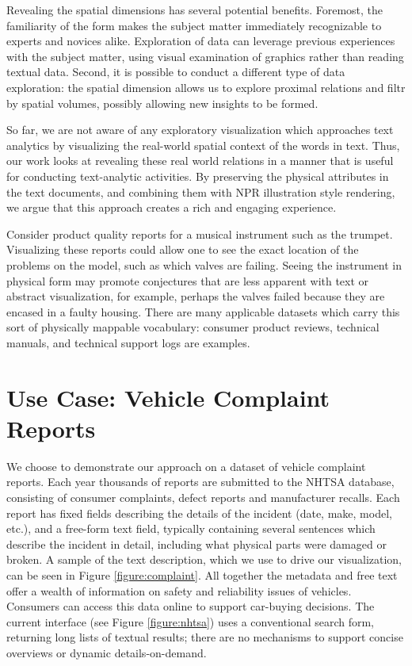 Revealing the spatial dimensions has several potential benefits. Foremost, the
familiarity of the form makes the subject matter immediately recognizable
to experts and novices alike. Exploration of data can leverage previous 
experiences with the subject matter, using visual examination of graphics 
rather than reading textual data. Second, it is possible to conduct a different
type of data exploration: the spatial dimension allows us to explore
proximal relations and filtr by spatial volumes, possibly allowing
new insights to be formed.

So far, we are not aware of any exploratory visualization which approaches text
analytics by visualizing the real-world spatial context of the words in
text. Thus, our work looks at revealing these real world relations in a manner
that is useful for conducting text-analytic activities. By preserving the physical
attributes in the text documents, and combining them with NPR illustration style 
rendering, we argue that this approach creates a rich and engaging experience.

Consider product quality reports for a musical instrument such as the trumpet.
Visualizing these reports could allow one to see the exact location of the problems on the
\threed model, such as which valves are failing. Seeing the instrument
in physical form may promote conjectures that are less apparent
with text or abstract visualization, for example, perhaps the valves
failed because they are encased in a faulty housing. There are many
applicable datasets which carry this sort of physically mappable vocabulary:
consumer product reviews, technical manuals, and technical
support logs are examples.
 


\section{Use Case: Vehicle Complaint Reports}
We choose to demonstrate our approach on a dataset of vehicle complaint
reports. Each year thousands of reports are submitted to the
NHTSA database, consisting of consumer complaints, defect reports
and manufacturer recalls. Each report has fixed fields describing the
details of the incident (date, make, model, etc.), and a free-form text
field, typically containing several sentences which describe the incident
in detail, including what physical parts were damaged or broken. A sample of the
text description, which we use to drive our visualization, can be seen in Figure
\ref{figure:complaint}.  All together the metadata and free
text offer a wealth of information on safety and reliability issues of
vehicles. Consumers can access this data online to support car-buying
decisions. The current interface (see Figure \ref{figure:nhtsa}) uses a
conventional search form, returning long lists of textual results; there are no mechanisms to support
concise overviews or dynamic details-on-demand. 

